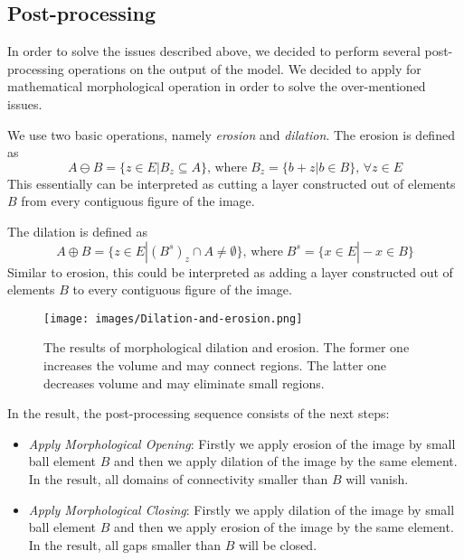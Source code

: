 \subsection{Post-processing}

In order to solve the issues described above, we decided to perform several post-processing operations on the output of the model.
We decided to apply for mathematical morphological operation in order to solve the over-mentioned issues.
\medskip

We use two basic operations, namely \emph{erosion} and \emph{dilation}\cite{bibl:er-dil}.
The erosion is defined as 
\begin{equation}
A \ominus B = \{z \in E | B_{z} \subseteq A \}, \, \mathrm{where} \; B_{z}=\{ b+z | b \in B \}, \, \forall z \in E 
\end{equation} 
This essentially can be interpreted as cutting a layer constructed out of elements $B$ from every contiguous figure of the image.
\medskip

The dilation is defined as 
\begin{equation}
A \oplus B = \{z \in E | (B^{s})_{z} \cap  A \neq \emptyset \}, \, \mathrm{where} \; B^{s}=\{x \in E | -x \in B \}
\end{equation} 
Similar to erosion, this could be interpreted as adding a layer constructed out of elements $B$ to every contiguous figure of the image. 
\medskip
\begin{figure}[h]
	\centering
	\texttt{[image: images/Dilation-and-erosion.png]}
	\label{fig:dil-eros}
	\caption{The results of morphological dilation and erosion. The former one increases the volume and may connect regions. The latter one decreases volume and may eliminate small regions.}
\end{figure}
\medskip

In the result, the post-processing sequence consists of the next steps:
\begin{itemize}
	\item \emph{Apply Morphological Opening}: Firstly we apply erosion of the image by small ball element $B$ and then we apply dilation of the image by the same element. In the result, all domains of connectivity smaller than $B$ will vanish.
	\item \emph{Apply Morphological Closing}: Firstly we apply dilation of the image by small ball element $B$ and then we apply erosion of the image by the same element. In the result, all gaps smaller than $B$ will be closed.
\end{itemize}
\medskip

